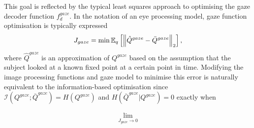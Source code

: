 This goal is reflected by the typical least squares approach to optimising the gaze decoder function $f^{gaze}_d$. In the notation of an eye processing model, gaze function optimisation is typically expressed
\begin{align}
    J_{gaze} = \min \mathbb{E}_{q}\left[\left\lVert\hat{Q}^{gaze} - \bar{Q}^{gaze}\right\rVert_2\right],
\end{align}
where $\hat{Q}^{gaze}$ is an approximation of $Q^{gaze}$ based on the assumption that the subject looked at a known fixed point at a certain point in time. Modifying the image processing functions and gaze model to minimise this error is naturally equivalent to the information-based optimisation since $\mathcal{I}(Q^{gaze};\bar{Q}^{gaze})=H(Q^{gaze})$ and $H(\bar{Q}^{gaze}|Q^{gaze})=0$ exactly when 

\begin{align}
	\lim_{J_{gaze}\rightarrow 0}
\end{align}


